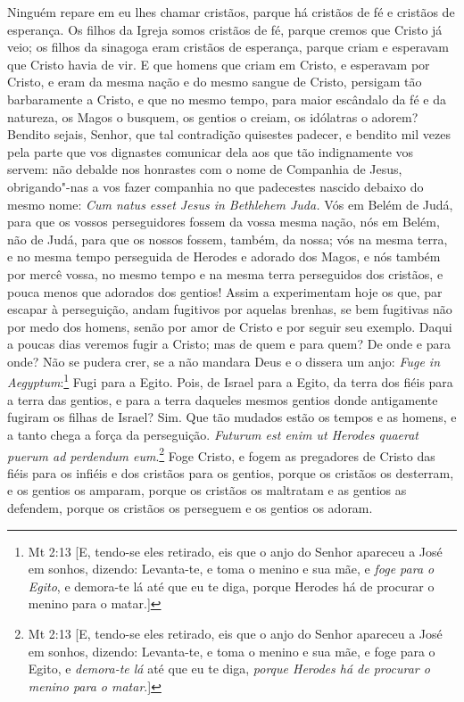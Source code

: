 Ninguém repare em eu lhes chamar cristãos, parque há cristãos de fé e
cristãos de esperança. Os filhos da Igreja somos cristãos de fé, parque
cremos que Cristo já veio; os filhos da sinagoga eram cristãos de
esperança, parque criam e esperavam que Cristo havia de vir. E que
homens que criam em Cristo, e esperavam por Cristo, e eram da mesma
nação e do mesmo sangue de Cristo, persigam tão barbaramente a Cristo, e
que no mesmo tempo, para maior escândalo da fé e da natureza, os Magos o
busquem, os gentios o creiam, os idólatras o adorem? Bendito sejais,
Senhor, que tal contradição quisestes padecer, e bendito mil vezes pela
parte que vos dignastes comunicar dela aos que tão indignamente vos
servem: não debalde nos honrastes com o nome de Companhia de Jesus,
obrigando"-nas a vos fazer companhia no que padecestes nascido debaixo do
mesmo nome: \emph{Cum natus esset Jesus in Bethlehem Juda.} Vós em Belém
de Judá, para que os vossos perseguidores fossem da vossa mesma nação,
nós em Belém, não de Judá, para que os nossos fossem, também, da nossa;
vós na mesma terra, e no mesma tempo perseguida de Herodes e adorado dos
Magos, e nós também por mercê vossa, no mesmo tempo e na mesma terra
perseguidos dos cristãos, e pouca menos que adorados dos gentios! Assim
a experimentam hoje os que, par escapar à perseguição, andam fugitivos
por aquelas brenhas, se bem fugitivas não por medo dos homens, senão por
amor de Cristo e por seguir seu exemplo. Daqui a poucas dias veremos
fugir a Cristo; mas de quem e para quem? De onde e para onde? Não se
pudera crer, se a não mandara Deus e o dissera um anjo: \emph{Fuge in
Aegyptum}:\footnote{Mt 2:13 [E, tendo-se eles retirado, eis que o anjo do Senhor apareceu a José em sonhos, dizendo: Levanta-te, e toma o menino e sua mãe, e \emph{foge para o Egito}, e demora-te lá até que eu te diga, porque Herodes há de procurar o menino para o matar.]} Fugi para a Egito. Pois, de Israel para a Egito, 
da terra dos fiéis para a terra das gentios, e para a terra daqueles
mesmos gentios donde antigamente fugiram os filhas de Israel? Sim. Que
tão mudados estão os tempos e as homens, e a tanto chega a força da
perseguição. \emph{Futurum est enim ut Herodes quaerat puerum ad
perdendum eum}.\footnote{Mt 2:13 [E, tendo-se eles retirado, eis que o anjo do Senhor apareceu a José em sonhos, dizendo: Levanta-te, e toma o menino e sua mãe, e foge para o Egito, e \emph{demora-te lá} até que eu te diga,
\emph{porque Herodes há de procurar o menino para o matar}.]}
Foge Cristo, e fogem as pregadores de Cristo das fiéis para os infiéis e
dos cristãos para os gentios, porque os cristãos os desterram, e os
gentios os amparam, porque os cristãos os maltratam e as gentios as
defendem, porque os cristãos os perseguem e os gentios os adoram.

